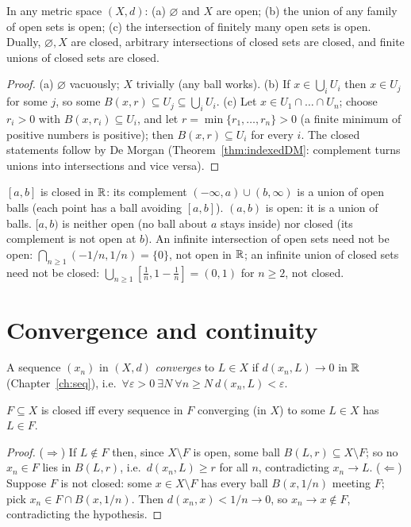\begin{theorem}\label{thm:metrictop}
	In any metric space $(X,d)$: (a) $\varnothing$ and $X$ are open; (b) the union of any family of open sets is open; (c) the intersection of finitely many open sets is open. Dually, $\varnothing,X$ are closed, arbitrary intersections of closed sets are closed, and finite unions of closed sets are closed.
\end{theorem}
\begin{proof}
	(a) $\varnothing$ vacuously; $X$ trivially (any ball works). (b) If $x\in\bigcup_i U_i$ then $x\in U_j$ for some $j$, so some $B(x,r)\subseteq U_j\subseteq\bigcup_iU_i$. (c) Let $x\in U_1\cap\dots\cap U_n$; choose $r_i>0$ with $B(x,r_i)\subseteq U_i$, and let $r=\min\{r_1,\dots,r_n\}>0$ (a finite minimum of positive numbers is positive); then $B(x,r)\subseteq U_i$ for every $i$. The closed statements follow by De Morgan (Theorem~\ref{thm:indexedDM}: complement turns unions into intersections and vice versa).
\end{proof}

\begin{example}
	$[a,b]$ is closed in $\mathbb{R}$: its complement $(-\infty,a)\cup(b,\infty)$ is a union of open balls (each point has a ball avoiding $[a,b]$). $(a,b)$ is open: it is a union of balls. $[a,b)$ is neither open (no ball about $a$ stays inside) nor closed (its complement is not open at $b$). An infinite intersection of open sets need not be open: $\bigcap_{n\ge1}(-1/n,1/n)=\{0\}$, not open in $\mathbb{R}$; an infinite union of closed sets need not be closed: $\bigcup_{n\ge1}[\frac1n,1-\frac1n]=(0,1)$ for $n\ge2$, not closed.
\end{example}

\section{Convergence and continuity}

\begin{definition}
	A sequence $(x_n)$ in $(X,d)$ \emph{converges} to $L\in X$ if $d(x_n,L)\to0$ in $\mathbb{R}$ (Chapter~\ref{ch:seq}), i.e.\ $\forall\varepsilon>0\ \exists N\ \forall n\ge N\ d(x_n,L)<\varepsilon$.
\end{definition}

\begin{proposition}\label{prop:closedseq}
	$F\subseteq X$ is closed iff every sequence in $F$ converging (in $X$) to some $L\in X$ has $L\in F$.
\end{proposition}
\begin{proof}
	($\Rightarrow$) If $L\notin F$ then, since $X\setminus F$ is open, some ball $B(L,r)\subseteq X\setminus F$; so no $x_n\in F$ lies in $B(L,r)$, i.e.\ $d(x_n,L)\ge r$ for all $n$, contradicting $x_n\to L$. ($\Leftarrow$) Suppose $F$ is not closed: some $x\in X\setminus F$ has every ball $B(x,1/n)$ meeting $F$; pick $x_n\in F\cap B(x,1/n)$. Then $d(x_n,x)<1/n\to0$, so $x_n\to x\notin F$, contradicting the hypothesis.
\end{proof}

